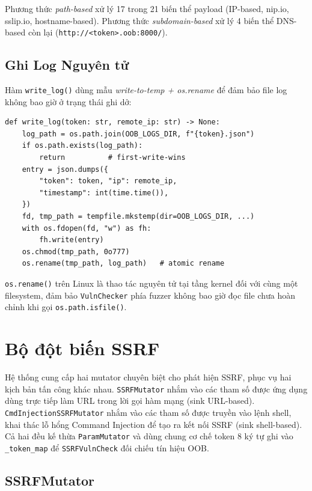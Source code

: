 Phương thức \textit{path-based} xử lý 17 trong 21 biến thể payload (IP-based,
nip.io, sslip.io, hostname-based).
Phương thức \textit{subdomain-based} xử lý 4 biến thể DNS-based còn lại
(\texttt{http://<token>.oob:8000/}).

\subsection{Ghi Log Nguyên tử}

Hàm \texttt{write\_log()} dùng mẫu \textit{write-to-temp + os.rename} để
đảm bảo file log không bao giờ ở trạng thái ghi dở:

\begin{verbatim}
def write_log(token: str, remote_ip: str) -> None:
    log_path = os.path.join(OOB_LOGS_DIR, f"{token}.json")
    if os.path.exists(log_path):
        return          # first-write-wins
    entry = json.dumps({
        "token": token, "ip": remote_ip,
        "timestamp": int(time.time()),
    })
    fd, tmp_path = tempfile.mkstemp(dir=OOB_LOGS_DIR, ...)
    with os.fdopen(fd, "w") as fh:
        fh.write(entry)
    os.chmod(tmp_path, 0o777)
    os.rename(tmp_path, log_path)   # atomic rename
\end{verbatim}

\texttt{os.rename()} trên Linux là thao tác nguyên tử tại tầng kernel đối với
cùng một filesystem, đảm bảo \texttt{VulnChecker} phía fuzzer không bao giờ
đọc file chưa hoàn chỉnh khi gọi \texttt{os.path.isfile()}.

\section{Bộ đột biến SSRF}
\label{sec:mutator-impl}

Hệ thống cung cấp hai mutator chuyên biệt cho phát hiện SSRF, phục vụ
hai kịch bản tấn công khác nhau.
\texttt{SSRFMutator} nhắm vào các tham số được ứng dụng dùng trực tiếp
làm URL trong lời gọi hàm mạng (sink URL-based).
\texttt{CmdInjectionSSRFMutator} nhắm vào các tham số được truyền vào
lệnh shell, khai thác lỗ hổng Command Injection để tạo ra kết nối SSRF
(sink shell-based).
Cả hai đều kế thừa \texttt{ParamMutator} và dùng chung cơ chế token
8 ký tự ghi vào \texttt{\_token\_map} để \texttt{SSRFVulnCheck} đối
chiếu tín hiệu OOB.

\subsection{SSRFMutator}

